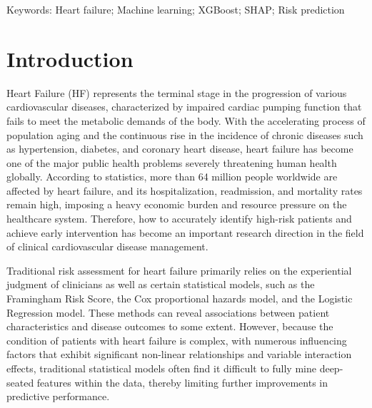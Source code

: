 \documentclass[11pt,a4paper]{article}
\begin{document}
\begin{abstract}
\begin{sloppypar}
\end{sloppypar}
\end{abstract}

Keywords: Heart failure; Machine learning; XGBoost; SHAP; Risk prediction
\newpage

\section{Introduction}
Heart Failure (HF) represents the terminal stage in the progression of various cardiovascular diseases, characterized by impaired cardiac pumping function that fails to meet the metabolic demands of the body. With the accelerating process of population aging and the continuous rise in the incidence of chronic diseases such as hypertension, diabetes, and coronary heart disease, heart failure has become one of the major public health problems severely threatening human health globally. According to statistics, more than 64 million people worldwide are affected by heart failure, and its hospitalization, readmission, and mortality rates remain high, imposing a heavy economic burden and resource pressure on the healthcare system. Therefore, how to accurately identify high-risk patients and achieve early intervention has become an important research direction in the field of clinical cardiovascular disease management.

Traditional risk assessment for heart failure primarily relies on the experiential judgment of clinicians as well as certain statistical models, such as the Framingham Risk Score, the Cox proportional hazards model, and the Logistic Regression model. These methods can reveal associations between patient characteristics and disease outcomes to some extent. However, because the condition of patients with heart failure is complex, with numerous influencing factors that exhibit significant non-linear relationships and variable interaction effects, traditional statistical models often find it difficult to fully mine deep-seated features within the data, thereby limiting further improvements in predictive performance.
\end{document}
